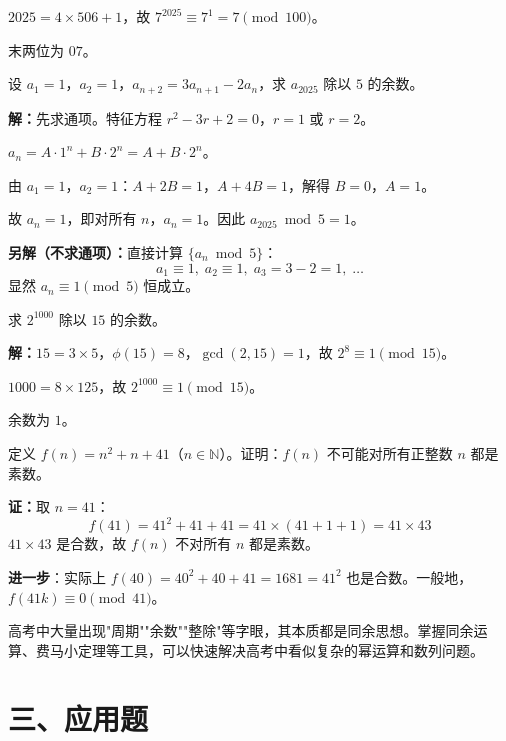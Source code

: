 \documentclass[12pt, a4paper]{ctexart}
\begin{document}
$2025 = 4 \times 506 + 1$，故 $7^{2025} \equiv 7^1 = 7 \pmod{100}$。

末两位为 $\boxed{07}$。

\begin{examplebox}
设 $a_1 = 1$，$a_2 = 1$，$a_{n+2} = 3a_{n+1} - 2a_n$，求 $a_{2025}$ 除以 $5$ 的余数。
\end{examplebox}

\textbf{解：}先求通项。特征方程 $r^2 - 3r + 2 = 0$，$r = 1$ 或 $r = 2$。

$a_n = A \cdot 1^n + B \cdot 2^n = A + B \cdot 2^n$。

由 $a_1 = 1$，$a_2 = 1$：$A + 2B = 1$，$A + 4B = 1$，解得 $B = 0$，$A = 1$。

故 $a_n = 1$，即对所有 $n$，$a_n = 1$。因此 $a_{2025} \bmod 5 = \boxed{1}$。

\textbf{另解（不求通项）：}直接计算 $\{a_n \bmod 5\}$：
\[ a_1 \equiv 1,\; a_2 \equiv 1,\; a_3 = 3 - 2 = 1,\; \ldots \]
显然 $a_n \equiv 1 \pmod{5}$ 恒成立。

\begin{examplebox}[【例题9】欧拉定理应用]
求 $2^{1000}$ 除以 $15$ 的余数。
\end{examplebox}

\textbf{解：}$15 = 3 \times 5$，$\phi(15) = 8$，$\gcd(2, 15) = 1$，故 $2^8 \equiv 1 \pmod{15}$。

$1000 = 8 \times 125$，故 $2^{1000} \equiv 1 \pmod{15}$。

余数为 $\boxed{1}$。

\begin{examplebox}[【例题10】综合——数论与函数]
定义 $f(n) = n^2 + n + 41$（$n \in \mathbb{N}$）。证明：$f(n)$ 不可能对所有正整数 $n$ 都是素数。
\end{examplebox}

\textbf{证：}取 $n = 41$：
\[ f(41) = 41^2 + 41 + 41 = 41 \times (41 + 1 + 1) = 41 \times 43 \]
$41 \times 43$ 是合数，故 $f(n)$ 不对所有 $n$ 都是素数。

\textbf{进一步}：实际上 $f(40) = 40^2 + 40 + 41 = 1681 = 41^2$ 也是合数。一般地，$f(41k) \equiv 0 \pmod{41}$。

\begin{tipbox}[数论视角的启示]
高考中大量出现"周期""余数""整除"等字眼，其本质都是同余思想。掌握同余运算、费马小定理等工具，可以快速解决高考中看似复杂的幂运算和数列问题。
\end{tipbox}

\section*{\textcolor{apppurple}{三、应用题}}
\end{document}
